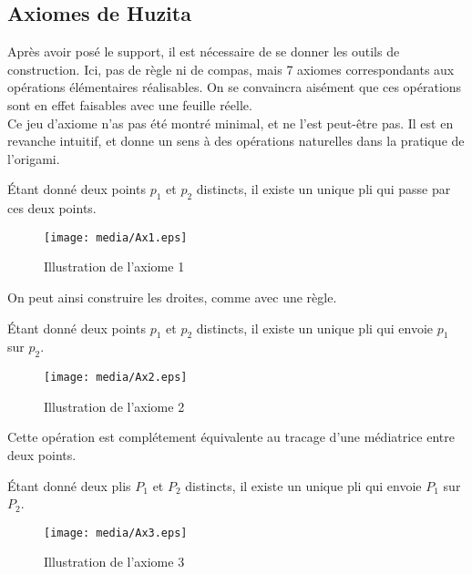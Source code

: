 \documentclass[a4paper,12pt,french]{report}
\begin{document}
	\subsection{Axiomes de Huzita}
		Après avoir posé le support, il est nécessaire de se donner les outils de construction. Ici, pas de règle ni de compas, mais 7 axiomes correspondants aux opérations élémentaires réalisables. On se convaincra aisément que ces opérations sont en effet faisables avec une feuille réelle. \\
		Ce jeu d'axiome n'as pas été montré minimal, et ne l'est peut-être pas. Il est en revanche intuitif, et donne un sens à des opérations naturelles dans la pratique de l'origami. 
		\begin{axiome}[1]
			Étant donné deux points $p_{1}$ et $p_{2}$ distincts, il existe un unique pli qui passe par ces deux points.
		\end{axiome}
		
		\begin{figure}
		    \begin{center}
			\texttt{[image: media/Ax1.eps]}
		    \end{center}
			\caption{Illustration de l'axiome 1}
		\end{figure}
		
		On peut ainsi construire les droites, comme avec une règle.
		\begin{axiome}[2]
			Étant donné deux points $p_{1}$ et $p_{2}$ distincts, il existe un unique pli qui envoie $p_{1}$ sur $p_{2}$.
		\end{axiome}
		
		\begin{figure}
		    \begin{center}
			\texttt{[image: media/Ax2.eps]}
		    \end{center}
			\caption{Illustration de l'axiome 2}
		\end{figure}
		
		Cette opération est complétement équivalente au tracage d'une médiatrice entre deux points.
		\begin{axiome}[3]
			Étant donné deux plis $P_{1}$ et $P_{2}$ distincts, il existe un unique pli qui envoie $P_{1}$ sur $P_{2}$.
		\end{axiome}
		
		\begin{figure}
		    \begin{center}
			\texttt{[image: media/Ax3.eps]}
		    \end{center}
			\caption{Illustration de l'axiome 3}
		\end{figure}
		
\end{document}

